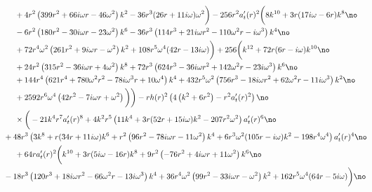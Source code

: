 \documentclass[preprintnumbers,aps,prd,longbibliography,nofootinbib,nobibnotes,amsmath,amssymb]{revtex4}
\begin{document}
\begin{align}
		&+4 r^2 \left(399 r^2+66 i \omega  r-46 \omega ^2\right) k^2-36 r^3 (26 r+11 i \omega ) \omega ^2\bigg) -256 r^2  a_t'(r)^2\bigg(8 k^{10}+3 r (17 i \omega -6 r) k^8\no\\
		&-6 r^2 \left(180 r^2-30 i \omega  r-23 \omega ^2\right) k^6-36 r^3 \left(114 r^3+21 i \omega  r^2-110 \omega ^2 r-i \omega ^3\right) k^4\no\\
		&+72 r^4 \omega ^2 \left(261 r^2+9 i \omega  r-\omega ^2\right) k^2+108 r^5 \omega ^4 (42 r-13 i \omega )\bigg)+256 \bigg(k^{12}+72 r (6 r-i \omega ) k^{10}\no\\
		&+24 r^2 \left(315 r^2-36 i \omega  r+4 \omega ^2\right) k^8+72 r^3 \left(624 r^3-36 i \omega  r^2+142 \omega ^2 r-23 i \omega ^3\right) k^6\no\\
		&+144 r^4 \left(621 r^4+780 \omega ^2 r^2-78 i \omega ^3 r+10 \omega ^4\right) k^4+432 r^5 \omega ^2 \left(756 r^3-18 i \omega  r^2+62 \omega ^2 r-11 i \omega ^3\right) k^2\no\\
		&+2592 r^6 \omega ^4 \left(42 r^2-7 i \omega  r+\omega ^2\right)\bigg)\bigg) -r h(r)^2 \left(4 \left(k^2+6 r^2\right)-r^2 a_t'(r){}^2\right) \no\\
		&\times \bigg(-21 k^4 r^7 a_t'(r)^8+4 k^2 r^5 \left(11 k^4+3 r (52 r+15 i \omega ) k^2-207 r^2 \omega ^2\right) a_t'(r)^6\no\\
		&\hspace{-0.5cm}+48 r^3 \left(3 k^8+r (34 r+11 i \omega ) k^6+r^2 \left(96 r^2-78 i \omega  r-11 \omega ^2\right) k^4+6 r^3 \omega ^2 (105 r-i \omega ) k^2-198 r^4 \omega ^4\right) a_t'(r)^4\no\\
		&+64 r  a_t'(r)^2 \bigg(k^{10}+3 r (5 i \omega -16 r) k^8+9 r^2 \left(-76 r^2+4 i \omega  r+11 \omega ^2\right) k^6\no\\
		&\hspace{-0.5cm}-18 r^3 \left(120 r^3+18 i \omega  r^2-66 \omega ^2 r-13 i \omega ^3\right) k^4+36 r^4 \omega ^2 \left(99 r^2-33 i \omega  r-\omega ^2\right) k^2+162 r^5 \omega ^4 (64 r-5 i \omega )\bigg)\no
		\end{align}
\end{document}
